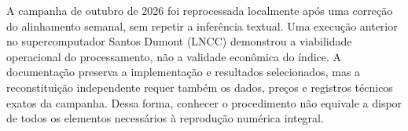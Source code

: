 A campanha de outubro de 2026 foi reprocessada localmente após uma correção do alinhamento semanal, sem repetir a inferência textual. Uma execução anterior no supercomputador Santos Dumont (LNCC) demonstrou a viabilidade operacional do processamento, não a validade econômica do índice. A documentação preserva a implementação e resultados selecionados, mas a reconstituição independente requer também os dados, preços e registros técnicos exatos da campanha. Dessa forma, conhecer o procedimento não equivale a dispor de todos os elementos necessários à reprodução numérica integral.
